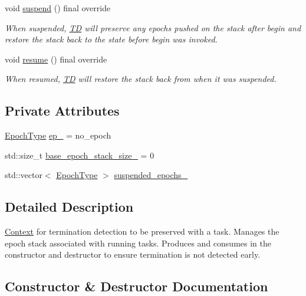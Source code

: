 \begin{DoxyCompactItemize}
void \hyperlink{structvt_1_1ctx_1_1_t_d_aa0a190994d71eda5321da08464a810a9}{suspend} () final override
\begin{DoxyCompactList}\small\item\em When suspended, {\ttfamily \hyperlink{structvt_1_1ctx_1_1_t_d}{TD}} will preserve any epochs pushed on the stack after begin and restore the stack back to the state before begin was invoked. \end{DoxyCompactList}\item 
void \hyperlink{structvt_1_1ctx_1_1_t_d_aa21b5afe01312244e338eefecde83bc6}{resume} () final override
\begin{DoxyCompactList}\small\item\em When resumed, {\ttfamily \hyperlink{structvt_1_1ctx_1_1_t_d}{TD}} will restore the stack back from when it was suspended. \end{DoxyCompactList}\end{DoxyCompactItemize}
\subsection*{Private Attributes}
\begin{DoxyCompactItemize}
\item 
\hyperlink{namespacevt_a81d11b28122d43bf9834577e4a06440f}{Epoch\+Type} \hyperlink{structvt_1_1ctx_1_1_t_d_a27c1d8888dd9b0fcc0b6a8f31f7ebdb7}{ep\+\_\+} = no\+\_\+epoch
\item 
std\+::size\+\_\+t \hyperlink{structvt_1_1ctx_1_1_t_d_ae63dbf338735e6ffd69ae2d67a24e3fb}{base\+\_\+epoch\+\_\+stack\+\_\+size\+\_\+} = 0
\item 
std\+::vector$<$ \hyperlink{namespacevt_a81d11b28122d43bf9834577e4a06440f}{Epoch\+Type} $>$ \hyperlink{structvt_1_1ctx_1_1_t_d_aa960a5f0ddf7725eb720d8bc68f1325f}{suspended\+\_\+epochs\+\_\+}
\end{DoxyCompactItemize}


\subsection{Detailed Description}
\hyperlink{structvt_1_1ctx_1_1_context}{Context} for termination detection to be preserved with a task. Manages the epoch stack associated with running tasks. Produces and consumes in the constructor and destructor to ensure termination is not detected early. 

\subsection{Constructor \& Destructor Documentation}
\mbox{\label{structvt_1_1ctx_1_1_t_d_ade8d2b390d1b4a484dd9f5f20546bc91}} 
